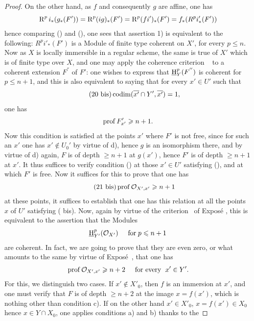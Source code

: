 \begin{proof}
On the other hand, as $f$ and consequently $g$ are affine, one has
\steco
\begin{equation} \label{eq:XII.20} {}\operatorname{R}^pi_\ast(g_\ast(F')) = \operatorname{R}^p(ig)_\ast(F') = \operatorname{R}^p(fi')_\ast(F') = f_\ast(R^pi'_\ast(F'))
\end{equation}
hence comparing () and (), one sees that assertion 1) is equivalent to the following: $R^pi'_\ast(F')$ is a Module of finite type \ie coherent on $X'$, for every $p\leq n$. Now as $X$ is locally immersible in a regular scheme, the same is true of $X'$ which is of finite type over $X$, and one may apply the coherence criterion ~ to a coherent extension $F^{''}$ of $F'$: one wishes to express that $\operatorname{\underline{H}}^p_Y(F^{''})$ is coherent for $p\leq n+1$, and this is also equivalent to saying that for every $x'\in U'$ such that
\begin{equation*} \label{eq:XII.20bis} \tag{20 bis} {}\operatorname{codim} (\overline{x'}\cap Y', \overline{x'})=1,
\end{equation*}
one has
\steco
\begin{equation} \label{eq:XII.21} {} \operatorname{prof} F'_{x'}\geqslant n+1.
\end{equation}
Now this condition is satisfied at the points $x'$ where $F'$ is not free, since for such an $x'$ one has $x'\notin U_0'$ by virtue of d), hence $g$ is an isomorphism there, and by virtue of d) again, $F$ is of depth $\geq n+1$ at $g(x')$, hence $F'$ is of depth $\geq n+1$ at $x'$. It thus suffices to verify condition () at those $x'\in U'$ satisfying (), and at which $F'$ is free. Now it suffices for this to prove that one has
\begin{equation*} \label{eq:XII.21bis} \tag{21 bis}
\operatorname{prof} {\mathcal O}_{X', x'}\geqslant n+1
\end{equation*}
%
at these points, \afortiori it suffices to establish that one has this relation at all the points~$x$ of $U'$ satisfying ( bis). Now, again by virtue of the criterion~ of Expos\'e , this is equivalent to the assertion that the Modules
\[
\operatorname{\underline{H}}^p_{Y'}({\mathcal O}_{X'}) \hspace{5mm} \text{for} \; p\leqslant n+1
\]
are coherent. In fact, we are going to prove that they are even zero, or what amounts to the same by virtue of Expos\'e~, that one has
\steco
\begin{equation} \label{eq:XII.22} {} \operatorname{prof} {\mathcal O}_{X', x'}\geqslant n+2 \hspace{5mm} \text{for every }\; x'\in Y'.
\end{equation}
For this, we distinguish two cases. If $x'\notin X'_0$, then $f$ is an immersion at $x'$, and one must verify that $F$ is of depth $\geq n+2$ at the image $x=f(x')$, which is nothing other than condition c). If on the other hand $x'\in X'_0$, \ie $x=f(x')\in X_0$ hence $x\in Y\cap X_0$, one applies conditions a) and b) thanks to the


\end{proof}
